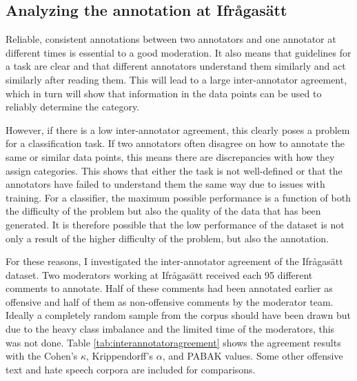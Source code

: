 \documentclass[nofilelist]{cslthse-msc}
\begin{document}
\subsection{Analyzing the annotation at Ifrågasätt}

Reliable, consistent annotations between two annotators and one annotator at different times is essential to a good moderation. It also means that guidelines for a task are clear and that different annotators understand them similarly and act similarly after reading them. This will lead to a large inter-annotator agreement, which in turn will show that information in the data points can be used to reliably determine the category. 

However, if there is a low inter-annotator agreement, this clearly poses a problem for a classification task. If two annotators often disagree on how to annotate the same or similar data points, this means there are discrepancies with how they assign categories. This shows that either the task is not well-defined or that the annotators have failed to understand them the same way due to issues with training. For a classifier, the maximum possible performance is a function of both the difficulty of the problem but also the quality of the data that has been generated. It is therefore possible that the low performance of the dataset is not only a result of the higher difficulty of the problem, but also the annotation.

For these reasons, I investigated the inter-annotator agreement of the Ifrågasätt dataset. Two moderators working at Ifrågasätt received each 95 different comments to annotate. Half of these comments had been annotated earlier as offensive and half of them as non-offensive comments by the moderator team. Ideally a completely random sample from the corpus should have been drawn but due to the heavy class imbalance and the limited time of the moderators, this was not done. Table \ref{tab:interannotatoragreement} shows the agreement results with the Cohen's $\kappa$, Krippendorff's $\alpha$, and PABAK values. Some other offensive text and hate speech corpora are included for comparisons.
\end{document}
